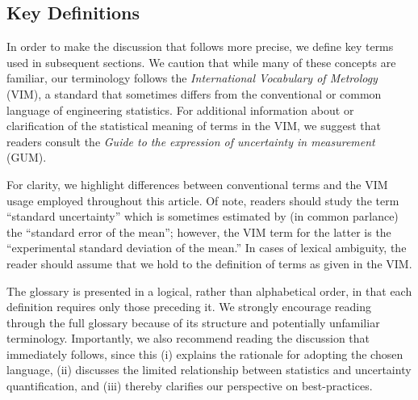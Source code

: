 \subsection{Key Definitions}

In order to make the discussion that follows more precise, we define key terms used in subsequent sections.
We caution that while many of these concepts are familiar, our terminology follows the {\it International Vocabulary of Metrology} (VIM)\citep{JCGM:VIM2012}, a standard that sometimes differs from the conventional or common language of engineering statistics. 
For additional information about or clarification of the statistical meaning of terms in the VIM, we suggest that readers consult the {\it Guide to the expression of uncertainty in measurement} (GUM)\citep{JCGM:GUM2008}.

For clarity, we highlight differences between conventional terms and the VIM usage employed throughout this article.
Of note, readers should study the term ``standard uncertainty'' which is sometimes estimated by (in common parlance) the ``standard error of the mean''; however, the VIM term for the latter is the ``experimental standard deviation of the mean.''
In cases of lexical ambiguity, the reader should assume that we hold to the definition of terms as given in the VIM.

The glossary is presented in a logical, rather than alphabetical order, in that each definition requires only those preceding it.
We strongly encourage reading through the full glossary because of its structure and potentially unfamiliar terminology.  Importantly, we also recommend reading the discussion that immediately follows, since this (i) explains the rationale for adopting the chosen language, (ii)  discusses the limited relationship between statistics and uncertainty quantification, and (iii) thereby clarifies our perspective on best-practices. 



